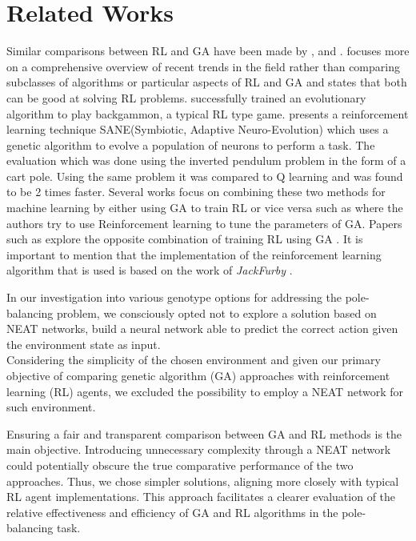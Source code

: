 \section{Related Works}

Similar comparisons between RL and GA have been made by \cite{drugan2019reinforcement},\cite{taylor2006comparing} and \cite{pollack1997coevolution}. \cite{drugan2019reinforcement}  focuses more on a comprehensive overview of recent trends in the field rather than comparing subclasses of algorithms or particular aspects of RL and GA and states that both can be good at solving RL problems. \cite{pollack1997coevolution} successfully trained an evolutionary algorithm to play backgammon, a typical RL type game. \cite{moriarty1996efficient} presents a reinforcement learning technique SANE(Symbiotic, Adaptive Neuro-Evolution) which uses a genetic algorithm to evolve a population of neurons to perform a task. The evaluation which was done using the inverted pendulum problem in the form of a cart pole. Using the same problem it was compared to Q learning and was found to be 2 times faster. Several works focus on combining these two methods for machine learning by either using GA to train RL or vice versa such as \cite{eiben2007reinforcement} where the authors try to use Reinforcement learning to tune the parameters of GA.  Papers such as  \cite{khadka2018evolutionary} explore the opposite combination of training RL using GA . It is important to mention that the implementation of the reinforcement learning algorithm that is used is based on the work of \textit{JackFurby} \cite{JackFurbyCartPole}. 

In our investigation into various genotype options for addressing the pole-balancing problem, we consciously opted not to explore a solution based on NEAT\cite{stanley2002NEAT} networks, build a neural network able to predict the correct action given the environment state as input.\\
Considering the simplicity of the chosen environment and given our primary objective of comparing genetic algorithm (GA) approaches with reinforcement learning (RL) agents, we excluded the possibility to employ a NEAT network for such environment.

Ensuring a fair and transparent comparison between GA and RL methods is the main objective. Introducing unnecessary complexity through a NEAT network could potentially obscure the true comparative performance of the two approaches. Thus, we chose simpler solutions, aligning more closely with typical RL agent implementations. This approach facilitates a clearer evaluation of the relative effectiveness and efficiency of GA and RL algorithms in the pole-balancing task.